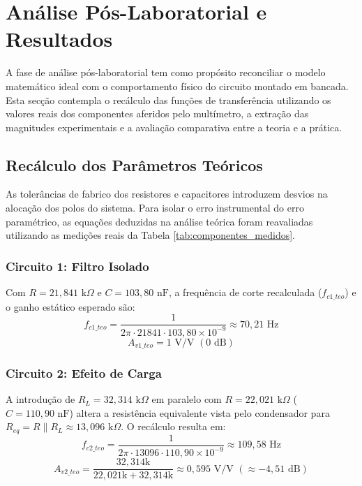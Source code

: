 \chapter{Análise Pós-Laboratorial e Resultados}

A fase de análise pós-laboratorial tem como propósito reconciliar o modelo matemático ideal com o comportamento físico do circuito montado em bancada. Esta secção contempla o recálculo das funções de transferência utilizando os valores reais dos componentes aferidos pelo multímetro, a extração das magnitudes experimentais e a avaliação comparativa entre a teoria e a prática.

\section{Recálculo dos Parâmetros Teóricos}

As tolerâncias de fabrico dos resistores e capacitores introduzem desvios na alocação dos polos do sistema. Para isolar o erro instrumental do erro paramétrico, as equações deduzidas na análise teórica foram reavaliadas utilizando as medições reais da Tabela \ref{tab:componentes_medidos}.

\subsection{Circuito 1: Filtro Isolado}
Com $R = 21,841\text{ k}\Omega$ e $C = 103,80\text{ nF}$, a frequência de corte recalculada ($f_{c1\_teo}$) e o ganho estático esperado são:
\begin{equation}
	f_{c1\_teo} = \frac{1}{2\pi \cdot 21841 \cdot 103,80 \times 10^{-9}} \approx 70,21\text{ Hz}
\end{equation}
\begin{equation}
	A_{v1\_teo} = 1\text{ V/V } (0\text{ dB})
\end{equation}

\subsection{Circuito 2: Efeito de Carga}
A introdução de $R_L = 32,314\text{ k}\Omega$ em paralelo com $R = 22,021\text{ k}\Omega$ ($C = 110,90\text{ nF}$) altera a resistência equivalente vista pelo condensador para $R_{eq} = R \parallel R_L \approx 13,096\text{ k}\Omega$. O recálculo resulta em:
\begin{equation}
	f_{c2\_teo} = \frac{1}{2\pi \cdot 13096 \cdot 110,90 \times 10^{-9}} \approx 109,58\text{ Hz}
\end{equation}
\begin{equation}
	A_{v2\_teo} = \frac{32,314\text{k}}{22,021\text{k} + 32,314\text{k}} \approx 0,595\text{ V/V } (\approx -4,51\text{ dB})
\end{equation}

